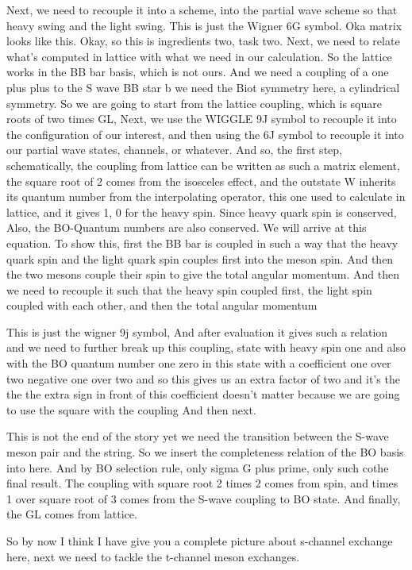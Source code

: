 \documentclass[11pt,a4paper]{article}
\begin{document}
Next, we need to recouple it into a scheme, into the partial wave scheme so that heavy swing and the light swing. This is just the Wigner 6G symbol. Oka matrix looks like this. Okay, so this is ingredients two, task two. Next, we need to relate what's computed in lattice with what we need in our calculation. So the lattice works in the BB bar basis, which is not ours. And we need a coupling of a one plus plus to the S wave BB star b we need the Biot symmetry here, a cylindrical symmetry. So we are going to start from the lattice coupling, which is square roots of two times GL, Next, we use the WIGGLE 9J symbol to recouple it into the configuration of our interest, and then using the 6J symbol to recouple it into our partial wave states, channels, or whatever. And so, the first step, schematically, the coupling from lattice can be written as such a matrix element, the square root of 2 comes from the isosceles effect, and the outstate W inherits its quantum number from the interpolating operator, this one used to calculate in lattice, and it gives 1, 0 for the heavy spin. Since heavy quark spin is conserved, Also, the BO-Quantum numbers are also conserved. We will arrive at this equation. To show this, first the BB bar is coupled in such a way that the heavy quark spin and the light quark spin couples first into the meson spin. And then the two mesons couple their spin to give the total angular momentum. And then we need to recouple it such that the heavy spin coupled first, the light spin coupled with each other, and then the total angular momentum

This is just the wigner 9j symbol, And after evaluation it gives such a relation and we need to further break up this coupling, state with heavy spin one and also with the BO quantum number one zero in this state with a coefficient one over two negative one over two and so this gives us an extra factor of two and it's the the the extra sign in front of this coefficient doesn't matter because we are going to use the square with the coupling And then next.

This is not the end of the story yet we need the transition between the S-wave meson pair and the string. So we insert the completeness relation of the BO basis into here. And by BO selection rule, only sigma G plus prime, only such cothe final result. The coupling with square root 2 times 2 comes from spin, and times 1 over square root of 3 comes from the S-wave coupling to BO state. And finally, the GL comes from lattice.

So by now I think I have give you a complete picture about s-channel exchange here, next we need to tackle the t-channel meson exchanges.
\end{document}
